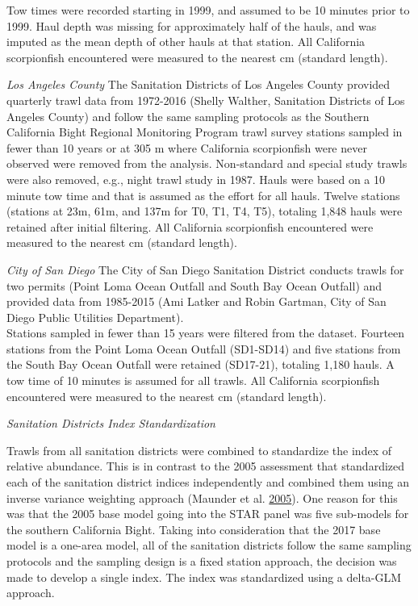 \documentclass[12pt,]{article}
\begin{document}
Tow times were recorded starting in 1999, and assumed to be 10 minutes
prior to 1999. Haul depth was missing for approximately half of the
hauls, and was imputed as the mean depth of other hauls at that station.
All California scorpionfish encountered were measured to the nearest cm
(standard length).

\emph{Los Angeles County} The Sanitation Districts of Los Angeles County
provided quarterly trawl data from 1972-2016 (Shelly Walther, Sanitation
Districts of Los Angeles County) and follow the same sampling protocols
as the Southern California Bight Regional Monitoring Program trawl
survey stations sampled in fewer than 10 years or at 305 m where
California scorpionfish were never observed were removed from the
analysis. Non-standard and special study trawls were also removed, e.g.,
night trawl study in 1987. Hauls were based on a 10 minute tow time and
that is assumed as the effort for all hauls. Twelve stations (stations
at 23m, 61m, and 137m for T0, T1, T4, T5), totaling 1,848 hauls were
retained after initial filtering. All California scorpionfish
encountered were measured to the nearest cm (standard length).

\emph{City of San Diego} The City of San Diego Sanitation District
conducts trawls for two permits (Point Loma Ocean Outfall and South Bay
Ocean Outfall) and provided data from 1985-2015 (Ami Latker and Robin
Gartman, City of San Diego Public Utilities Department).\\
Stations sampled in fewer than 15 years were filtered from the dataset.
Fourteen stations from the Point Loma Ocean Outfall (SD1-SD14) and five
stations from the South Bay Ocean Outfall were retained (SD17-21),
totaling 1,180 hauls. A tow time of 10 minutes is assumed for all
trawls. All California scorpionfish encountered were measured to the
nearest cm (standard length).

\emph{Sanitation Districts Index Standardization}

Trawls from all sanitation districts were combined to standardize the
index of relative abundance. This is in contrast to the 2005 assessment
that standardized each of the sanitation district indices independently
and combined them using an inverse variance weighting approach (Maunder
et al. \protect\hyperlink{ref-Maunder2005}{2005}). One reason for this
was that the 2005 base model going into the STAR panel was five
sub-models for the southern California Bight. Taking into consideration
that the 2017 base model is a one-area model, all of the sanitation
districts follow the same sampling protocols and the sampling design is
a fixed station approach, the decision was made to develop a single
index. The index was standardized using a delta-GLM approach.
\end{document}
